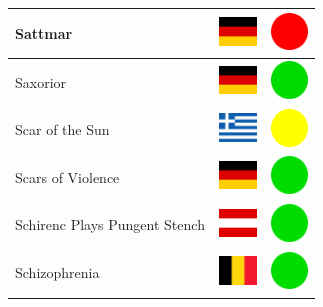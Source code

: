 \documentclass[12pt, a4paper, twoside]{report}
\begin{document}
\begin{center}
\begin{longtable}{|p{5cm}|p{2cm}|p{2cm}|}
 Sattmar                                                    & \includegraphics[width=1cm]{../4x3/de} &   \includegraphics[width=1cm]{../likes/n} \\ \hline
 Saxorior                                                   & \includegraphics[width=1cm]{../4x3/de} &   \includegraphics[width=1cm]{../likes/y} \\ \hline
 Scar of the Sun                                            & \includegraphics[width=1cm]{../4x3/gr} &   \includegraphics[width=1cm]{../likes/m} \\ \hline
 Scars of Violence                                          & \includegraphics[width=1cm]{../4x3/de} &   \includegraphics[width=1cm]{../likes/y} \\ \hline
 Schirenc Plays Pungent Stench                              & \includegraphics[width=1cm]{../4x3/at} &   \includegraphics[width=1cm]{../likes/y} \\ \hline
 Schizophrenia                                              & \includegraphics[width=1cm]{../4x3/be} &   \includegraphics[width=1cm]{../likes/y} \\ \hline

\end{longtable}
\end{center}
\end{document}
